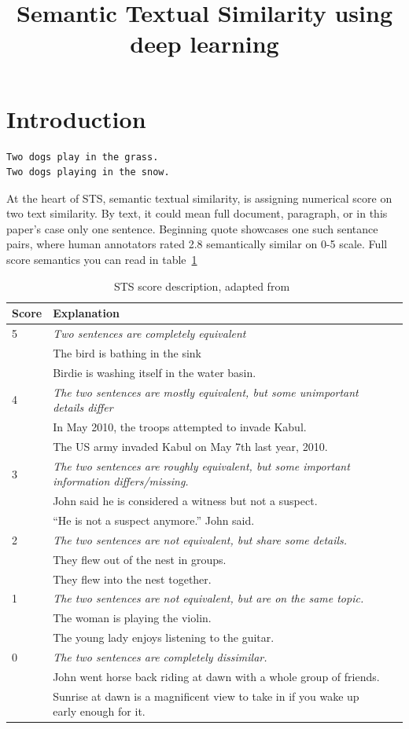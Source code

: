 \documentclass[10pt, a4paper]{article}
\title{Semantic Textual Similarity using deep learning}
\begin{document}
\maketitleabstract

\section{Introduction}

\begin{verbatim}
Two dogs play in the grass.
Two dogs playing in the snow.
\end{verbatim}

At the heart of STS, semantic textual similarity, is assigning numerical score on two text similarity. By text, it could mean full document, paragraph, or in this paper's case only one sentence. Beginning quote showcases one such sentance pairs, where human annotators rated 2.8 semantically similar on 0-5 scale. Full score semantics you can read in table~\ref{tab:sts-score}

\begin{table}
\caption{STS score description, adapted from~\citep{agirre2016semeval}}
\label{tab:sts-score}
\begin{center}
\begin{tabular}{llr}
\toprule
Score & Explanation\\
\midrule
5 & \textit{Two sentences are completely equivalent}\\
& The bird is bathing in the sink\\
& Birdie is washing itself in the water basin.\\
\midrule
4 & \textit{The two sentences are mostly equivalent, but some unimportant details differ}\\
& In May 2010, the troops attempted to invade
Kabul. \\
& The US army invaded Kabul on May 7th last
year, 2010.\\
\midrule
3 & \textit{The two sentences are roughly equivalent, but some important information differs/missing.}\\
& John said he is considered a witness but not a
suspect.\\
& ``He is not a suspect anymore.'' John said.\\
\midrule
2 & \textit{The two sentences are not equivalent, but share some details.} \\
&They flew out of the nest in groups. \\
&They flew into the nest together. \\
\midrule
1 & \textit{The two sentences are not equivalent, but are on the same topic.}\\
& The woman is playing the violin.\\
& The young lady enjoys listening to the guitar.\\
\midrule
0 & \textit{The two sentences are completely dissimilar.}\\
& John went horse back riding at dawn with a whole group of friends.\\
& Sunrise at dawn is a magnificent view to take in if you wake up early enough for it.\\
\bottomrule
\end{tabular}
\end{center}
\end{table}
\end{document}
